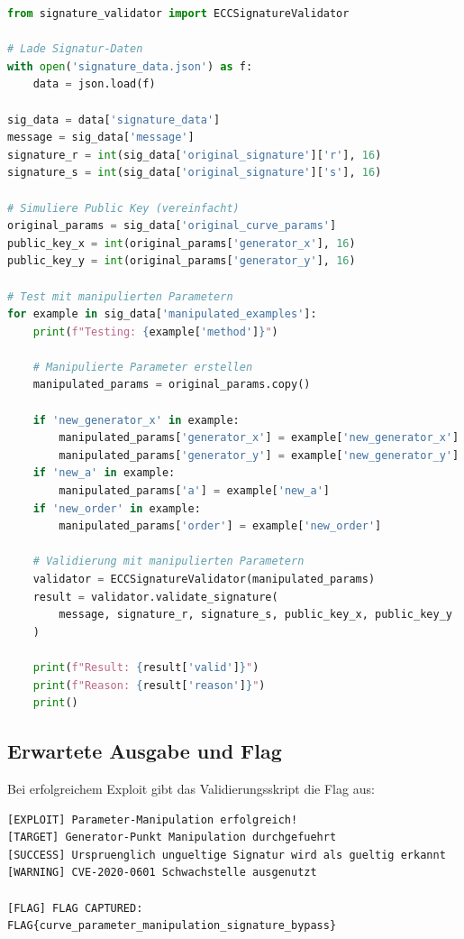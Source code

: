\documentclass{article}
\begin{document}
\begin{lstlisting}[language=python, caption=Vollständiger Exploit]
from signature_validator import ECCSignatureValidator

# Lade Signatur-Daten
with open('signature_data.json') as f:
    data = json.load(f)

sig_data = data['signature_data']
message = sig_data['message']
signature_r = int(sig_data['original_signature']['r'], 16)
signature_s = int(sig_data['original_signature']['s'], 16)

# Simuliere Public Key (vereinfacht)
original_params = sig_data['original_curve_params']
public_key_x = int(original_params['generator_x'], 16)
public_key_y = int(original_params['generator_y'], 16)

# Test mit manipulierten Parametern
for example in sig_data['manipulated_examples']:
    print(f"Testing: {example['method']}")
    
    # Manipulierte Parameter erstellen
    manipulated_params = original_params.copy()
    
    if 'new_generator_x' in example:
        manipulated_params['generator_x'] = example['new_generator_x']
        manipulated_params['generator_y'] = example['new_generator_y']
    if 'new_a' in example:
        manipulated_params['a'] = example['new_a']
    if 'new_order' in example:
        manipulated_params['order'] = example['new_order']
    
    # Validierung mit manipulierten Parametern
    validator = ECCSignatureValidator(manipulated_params)
    result = validator.validate_signature(
        message, signature_r, signature_s, public_key_x, public_key_y
    )
    
    print(f"Result: {result['valid']}")
    print(f"Reason: {result['reason']}")
    print()
\end{lstlisting}

\subsection{Erwartete Ausgabe und Flag}

Bei erfolgreichem Exploit gibt das Validierungsskript die Flag aus:

\begin{lstlisting}[caption=Erfolgreicher Exploit]
[EXPLOIT] Parameter-Manipulation erfolgreich!
[TARGET] Generator-Punkt Manipulation durchgefuehrt
[SUCCESS] Urspruenglich ungueltige Signatur wird als gueltig erkannt
[WARNING] CVE-2020-0601 Schwachstelle ausgenutzt

[FLAG] FLAG CAPTURED:
FLAG{curve_parameter_manipulation_signature_bypass}
\end{lstlisting}
\end{document}
